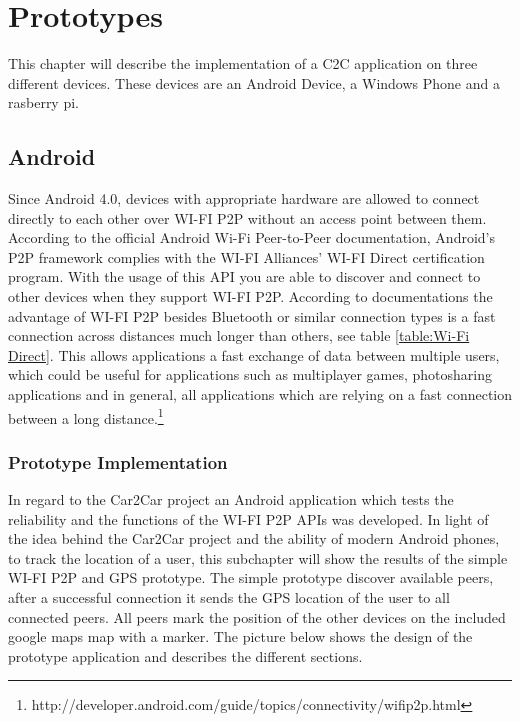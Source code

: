 \chapter{Prototypes}
\label{cha:Prototypes}
This chapter will describe the implementation of a C2C application on three different devices. These devices are an Android Device, a Windows Phone and a rasberry pi.

\section{Android}
Since Android 4.0, devices with appropriate hardware are allowed to connect directly to each other over WI-FI P2P without an access point between them. According to the official Android Wi-Fi Peer-to-Peer documentation, Android's P2P framework complies with the WI-FI Alliances' WI-FI Direct certification program. With the usage of this API you are able to discover and connect to other devices when they support WI-FI P2P.  According to documentations the advantage of WI-FI P2P besides Bluetooth or similar connection types is a fast connection across distances much longer than others, see table \ref{table:Wi-Fi Direct}. This allows applications a fast exchange of data between multiple users, which could be useful for applications such as multiplayer games, photosharing applications and in general, all applications which are relying on a fast connection between a long distance.\footnote{\label{foot:1}http://developer.android.com/guide/topics/connectivity/wifip2p.html}

\subsection*{Prototype Implementation}
\label{subsec:AndroidPrototype}
In regard to the Car2Car project an Android application which tests the reliability and the functions of the WI-FI P2P APIs was developed. In light of the idea behind the Car2Car project and the ability of modern Android phones, to track the location of a user, this subchapter will show the results of the simple WI-FI P2P and GPS prototype.
The simple prototype discover available peers, after a successful connection it  sends the GPS location of the user to all connected peers. All peers mark the position of the other devices on the included google maps map with a marker. The picture below shows the design of the prototype application and describes the different sections.

